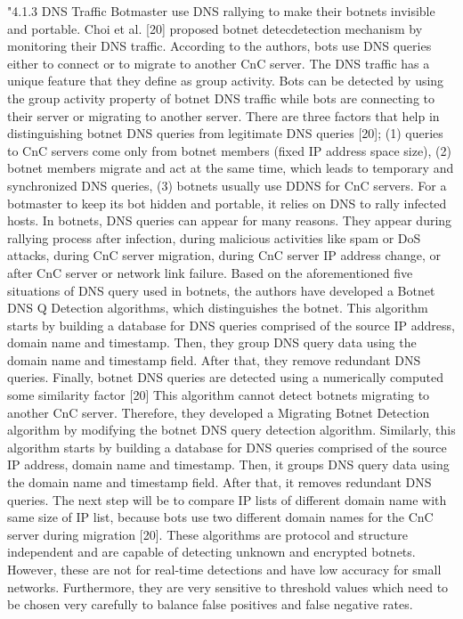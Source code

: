 "4.1.3 DNS Traffic Botmaster use DNS rallying to make their botnets invisible and portable. Choi et
al. [20] proposed botnet detecdetection mechanism by monitoring their DNS traffic. According to the
authors, bots use DNS queries either to connect or to migrate to another CnC server. The DNS
traffic has a unique feature that they define as group activity. Bots can be detected by using the
group activity property of botnet DNS traffic while bots are connecting to their server or migrating
to another server. There are three factors that help in distinguishing botnet DNS queries from
legitimate DNS queries [20]; (1) queries to CnC servers come only from botnet members (fixed IP
address space size), (2) botnet members migrate and act at the same time, which leads to temporary
and synchronized DNS queries, (3) botnets usually use DDNS for CnC servers. For a botmaster to
keep its bot hidden and portable, it relies on DNS to rally infected hosts. In botnets, DNS queries
can appear for many reasons. They appear during rallying process after infection, during malicious
activities like spam or DoS attacks, during CnC server migration, during CnC server IP address
change, or after CnC server or network link failure. Based on the aforementioned five situations of
DNS query used in botnets, the authors have developed a Botnet DNS Q Detection algorithms, which
distinguishes the botnet. This algorithm starts by building a database for DNS queries comprised of
the source IP address, domain name and timestamp. Then, they group DNS query data using the
domain name and timestamp field. After that, they remove redundant DNS queries. Finally, botnet
DNS queries are detected using a numerically computed some similarity factor [20] This algorithm
cannot detect botnets migrating to another CnC server. Therefore, they developed a Migrating
Botnet Detection algorithm by modifying the botnet DNS query detection algorithm. Similarly, this
algorithm starts by building a database for DNS queries comprised of the source IP address, domain
name and timestamp. Then, it groups DNS query data using the domain name and timestamp field.
After that, it removes redundant DNS queries. The next step will be to compare IP lists of different
domain name with same size of IP list, because bots use two different domain names for the CnC
server during migration [20]. These algorithms are protocol and structure independent and are
capable of detecting unknown and encrypted botnets. However, these are not for real-time
detections and have low accuracy for small networks. Furthermore, they are very sensitive to
threshold values which need to be chosen very carefully to balance false positives and false negative
rates.


